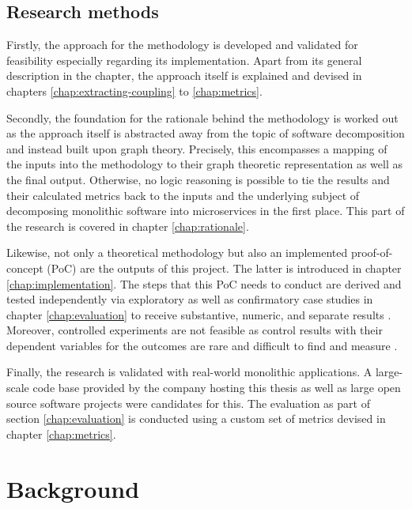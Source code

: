 \documentclass[12pt,a4paper]{report}
\begin{document}
\section{Research methods}

Firstly, the approach for the methodology is developed and validated
for feasibility especially regarding its implementation.
Apart from its general description in the \textit{} chapter,
the approach itself is explained and devised in chapters
\ref{chap:extracting-coupling} to \ref{chap:metrics}.

Secondly, the foundation for the rationale behind the methodology is worked out
as the approach itself is abstracted away from the topic of
software decomposition and instead built upon graph theory.
Precisely, this encompasses a mapping of the inputs into the methodology to
their graph theoretic representation as well as the final output.
Otherwise, no logic reasoning is possible to tie the results and
their calculated metrics back to the inputs and the underlying subject
of decomposing monolithic software into microservices in the first place.
This part of the research is covered in chapter \ref{chap:rationale}.

Likewise, not only a theoretical methodology but also an implemented
proof-of-concept (PoC) are the outputs of this project.
The latter is introduced in chapter \ref{chap:implementation}.
The steps that this PoC needs to conduct are derived and tested
independently via exploratory as well as confirmatory case studies
in chapter \ref{chap:evaluation} to receive substantive, numeric,
and separate results \cite{easterbrook2008selecting}.
Moreover, controlled experiments are not feasible as control results
with their dependent variables for the outcomes are rare and difficult
to find and measure \cite{easterbrook2008selecting}.

Finally, the research is validated with real-world monolithic applications.
A large-scale code base provided by the company hosting this thesis as well as
large open source software projects were candidates for this.
The evaluation as part of section \ref{chap:evaluation} is conducted using
a custom set of metrics devised in chapter \ref{chap:metrics}.




\chapter{Background} \label{chap:background}
\end{document}
